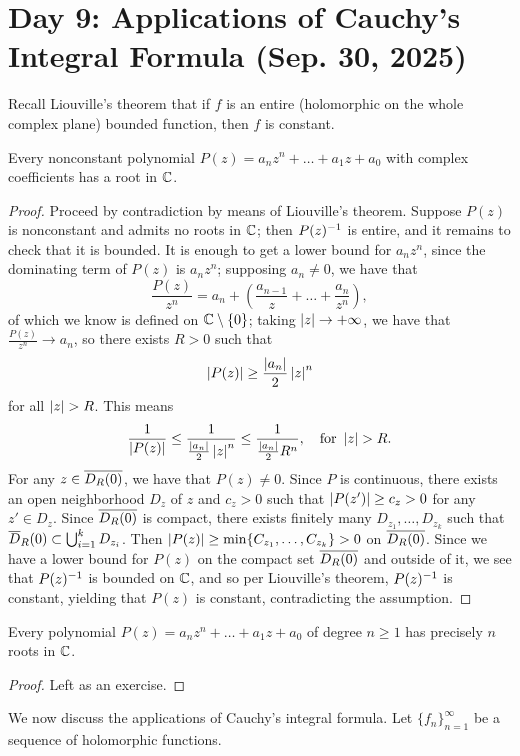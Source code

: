 \section{Day 9: Applications of Cauchy's Integral Formula (Sep. 30, 2025)}
Recall Liouville's theorem that if $f$ is an entire (holomorphic on the whole complex plane) bounded function, then $f$ is constant.
\begin{corollary}
    Every nonconstant polynomial $P(z) = a_nz^n + \dots + a_1z + a_0$ with complex coefficients has a root in $\mathbb C$.
\end{corollary}
\begin{proof}
    Proceed by contradiction by means of Liouville's theorem. Suppose $P(z)$ is nonconstant and admits no roots in $\mathbb C$; then $P(z)^{-1}$ is entire, and it remains to check that it is bounded. It is enough to get a lower bound for $a_nz^n$, since the dominating term of $P(z)$ is $a_nz^n$; supposing $a_n \neq 0$, we have that
    \[ \frac{P(z)}{z^n} = a_n + \left(\frac{a_{n-1}}{z} + \dots + \frac{a_n}{z^n}\right), \]
    of which we know is defined on $\mathbb C \setminus \{0\}$; taking $\left\lvert z \right\rvert \to +\infty$, we have that $\frac{P(z)}{z^n} \to a_n$, so there exists $R > 0$ such that
    \[ \left\lvert P(z) \right\rvert \geq \frac{\left\lvert a_n \right\rvert}{2} \left\lvert z \right\rvert^n \]
    for all $\left\lvert z \right\rvert > R$. This means
    \[ \frac{1}{\left\lvert P(z) \right\rvert} \leq \frac{1}{\frac{\left\lvert a_n \right\rvert}{2} \left\lvert z \right\rvert^n} \leq \frac{1}{\frac{\left\lvert a_n \right\rvert}{2} R^n}, \quad \text{for } \left\lvert z \right\rvert > R. \]
    For any $z \in \overline{D_R(0)}$, we have that $P(z) \neq 0$. Since $P$ is continuous, there exists an open neighborhood $D_z$ of $z$ and $c_z > 0$ such that $\left\lvert P(z') \right\rvert \geq c_z > 0$ for any $z' \in D_z$. Since $\overline{D_R(0)}$ is compact, there exists finitely many $D_{z_1}, \dots, D_{z_k}$ such that $\overline D_R(0) \subset \bigcup_{i=1}^k D_{z_i}$. Then $\left\lvert P(z) \right\rvert \geq \min\{C_{z_1}, \dots, C_{z_k}\} > 0$ on $\overline{D_R(0)}$. Since we have a lower bound for $P(z)$ on the compact set $\overline{D_R(0)}$ and outside of it, we see that $P(z)^{-1}$ is bounded on $\mathbb C$, and so per Liouville's theorem, $P(z)^{-1}$ is constant, yielding that $P(z)$ is constant, contradicting the assumption.
\end{proof}
\begin{corollary}
    Every polynomial $P(z) = a_nz^n + \dots + a_1z + a_0$ of degree $n \geq 1$ has precisely $n$ roots in $\mathbb C$.
\end{corollary}
\begin{proof}
    Left as an exercise.
\end{proof}
\noindent We now discuss the applications of Cauchy's integral formula. Let $\{f_n\}_{n=1}^\infty$ be a sequence of holomorphic functions.
